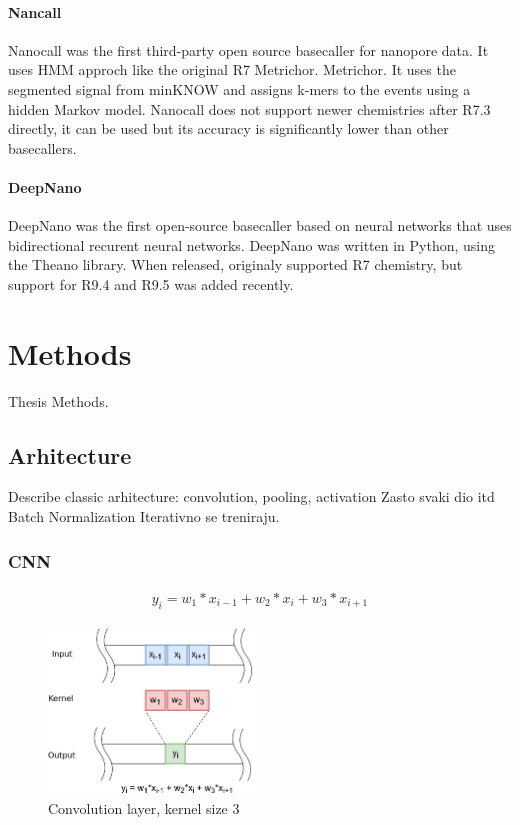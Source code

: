 \documentclass[times, utf8, diplomski, numeric, english]{fer}
\begin{document}
\subsubsection{Nancall}

Nanocall\cite{David046086} was the first third-party open source basecaller for nanopore data. It uses HMM approch like the original R7 Metrichor. Metrichor. It uses the segmented signal from minKNOW and assigns k-mers to the events using a hidden Markov model. 
Nanocall does not support newer chemistries after R7.3 directly, it can be used but its accuracy is significantly lower than other basecallers.
 
 
\subsubsection{DeepNano}
DeepNano\cite{Boza2017}  was the first open-source basecaller based on neural networks that uses bidirectional recurent neural networks. DeepNano was written in Python, using the Theano library. When released, originaly supported R7 chemistry, but support for R9.4 and R9.5 was added recently.



\chapter{Methods}
Thesis Methods.
\section{Arhitecture}
Describe classic arhitecture: convolution, pooling, activation
Zasto svaki dio itd
Batch Normalization 
Iterativno se treniraju.
\subsection{CNN}

\begin{gather*}
y_i = w_1 * x_{i-1} + w_2 * x_{i} + w_3 * x_{i+1}
\end{gather*}
\begin{figure}[!ht]
	\begin{center}
		\includegraphics[width=0.5\textwidth]{./imgs/convolution.png}
		\caption{Convolution layer, kernel size 3}
		\label{fg:convolution}
	\end{center}
\end{figure}
\end{document}
